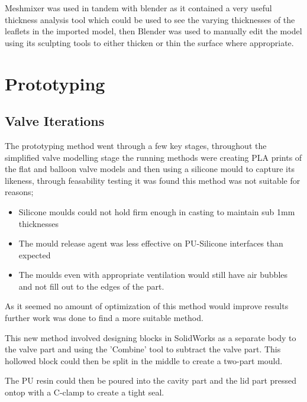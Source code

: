 Meshmixer was used in tandem with blender as it contained a very useful thickness analysis tool which could be used to see the varying thicknesses of the leaflets in the imported model, then Blender was used to manually edit the model using its sculpting tools to either thicken or thin the surface where appropriate.







\section{Prototyping}
\subsection{Valve Iterations}
The prototyping method went through a few key stages, throughout the simplified valve modelling stage the running methods were creating \gls{PLA} prints of the flat and balloon valve models and then using a silicone mould to capture its likeness, through feasability testing it was found this method was not suitable for reasons;
\begin{itemize}
  \item Silicone moulds could not hold firm enough in casting to maintain sub 1mm thicknesses
  \item The mould release agent was less effective on PU-Silicone interfaces than expected 
  \item The moulds even with appropriate ventilation would still have air bubbles and not fill out to the edges of the part.
\end{itemize}
As it seemed no amount of optimization of this method would improve results further work was done to find a more suitable method.

This new method involved designing blocks in SolidWorks as a separate body to the valve part and using the 'Combine' tool to subtract the valve part. This hollowed block could then be split in the middle to create a two-part mould.

The \gls{PU} resin  could then be poured into the cavity part and the lid part pressed ontop with a C-clamp to create a tight seal.

